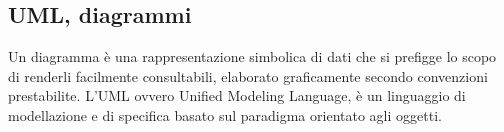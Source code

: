 
\subsection*{UML, diagrammi}
Un diagramma è una rappresentazione simbolica di dati che si prefigge lo scopo di renderli facilmente consultabili, elaborato graficamente secondo convenzioni prestabilite. L'UML ovvero Unified Modeling Language, è un linguaggio di modellazione e di specifica basato sul paradigma orientato agli oggetti. 

